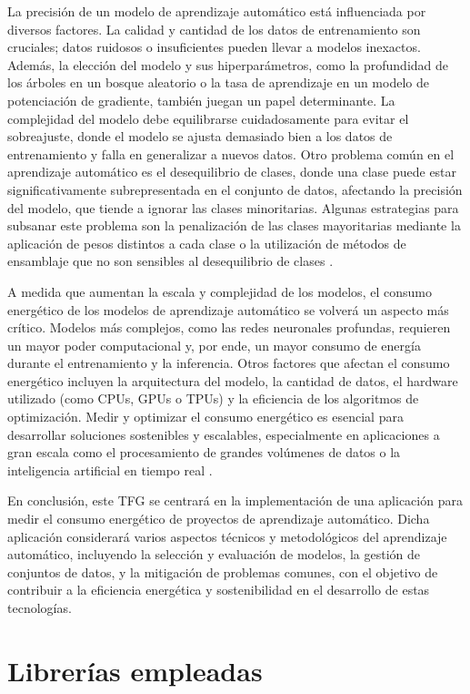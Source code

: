La precisión de un modelo de aprendizaje automático está influenciada por diversos factores. La calidad y cantidad de los datos de entrenamiento son cruciales; datos ruidosos o insuficientes pueden llevar a modelos inexactos. Además, la elección del modelo y sus hiperparámetros, como la profundidad de los árboles en un bosque aleatorio o la tasa de aprendizaje en un modelo de potenciación de gradiente, también juegan un papel determinante. La complejidad del modelo debe equilibrarse cuidadosamente para evitar el sobreajuste, donde el modelo se ajusta demasiado bien a los datos de entrenamiento y falla en generalizar a nuevos datos.
Otro problema común en el aprendizaje automático es el desequilibrio de clases, donde una clase puede estar significativamente subrepresentada en el conjunto de datos, afectando la precisión del modelo, que tiende a ignorar las clases minoritarias. Algunas estrategias para subsanar este problema son la penalización de las clases mayoritarias mediante la aplicación de pesos distintos a cada clase o la utilización de métodos de ensamblaje que no son sensibles al desequilibrio de clases \cite{fernandez2018learning}.

A medida que aumentan la escala y complejidad de los modelos, el consumo energético de los modelos de aprendizaje automático se volverá un aspecto más crítico. Modelos más complejos, como las redes neuronales profundas, requieren un mayor poder computacional y, por ende, un mayor consumo de energía durante el entrenamiento y la inferencia. Otros factores que afectan el consumo energético incluyen la arquitectura del modelo, la cantidad de datos, el hardware utilizado (como CPUs, GPUs o TPUs) y la eficiencia de los algoritmos de optimización. Medir y optimizar el consumo energético es esencial para desarrollar soluciones sostenibles y escalables, especialmente en aplicaciones a gran escala como el procesamiento de grandes volúmenes de datos o la inteligencia artificial en tiempo real \cite{eva2019review}.

En conclusión, este TFG se centrará en la implementación de una aplicación para medir el consumo energético de proyectos de aprendizaje automático. Dicha aplicación considerará varios aspectos técnicos y metodológicos del aprendizaje automático, incluyendo la selección y evaluación de modelos, la gestión de conjuntos de datos, y la mitigación de problemas comunes, con el objetivo de contribuir a la eficiencia energética y sostenibilidad en el desarrollo de estas tecnologías.

\section{Librerías empleadas}

